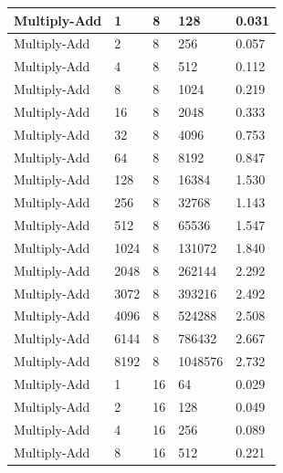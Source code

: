 \documentclass{article}
\begin{document}
\begin{longtable}{|l|l|l|l|l|}
Multiply-Add       & 1    & 8           & 128               & 0.031             \\ \hline
Multiply-Add       & 2    & 8           & 256               & 0.057             \\ \hline
Multiply-Add       & 4    & 8           & 512               & 0.112             \\ \hline
Multiply-Add       & 8    & 8           & 1024              & 0.219             \\ \hline
Multiply-Add       & 16   & 8           & 2048              & 0.333             \\ \hline
Multiply-Add       & 32   & 8           & 4096              & 0.753             \\ \hline
Multiply-Add       & 64   & 8           & 8192              & 0.847             \\ \hline
Multiply-Add       & 128  & 8           & 16384             & 1.530             \\ \hline
Multiply-Add       & 256  & 8           & 32768             & 1.143             \\ \hline
Multiply-Add       & 512  & 8           & 65536             & 1.547             \\ \hline
Multiply-Add       & 1024 & 8           & 131072            & 1.840             \\ \hline
Multiply-Add       & 2048 & 8           & 262144            & 2.292             \\ \hline
Multiply-Add       & 3072 & 8           & 393216            & 2.492             \\ \hline
Multiply-Add       & 4096 & 8           & 524288            & 2.508             \\ \hline
Multiply-Add       & 6144 & 8           & 786432            & 2.667             \\ \hline
Multiply-Add       & 8192 & 8           & 1048576           & 2.732             \\ \hline
Multiply-Add       & 1    & 16          & 64                & 0.029             \\ \hline
Multiply-Add       & 2    & 16          & 128               & 0.049             \\ \hline
Multiply-Add       & 4    & 16          & 256               & 0.089             \\ \hline
Multiply-Add       & 8    & 16          & 512               & 0.221             \\ \hline

\end{longtable}
\end{document}
